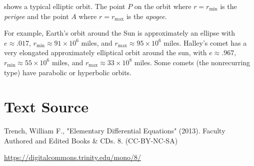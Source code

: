 \documentclass{ximera}
\begin{document}

 shows a typical elliptic orbit.
The point $P$ on the orbit where $r=r_{\min}$ is the  \textit{perigee} and  the point $A$ where $r=r_{\max}$ is the \textit{apogee}.

For example, Earth's orbit around the Sun is approximately an ellipse
with $e\approx.017$, $r_{\min}\approx91\times 10^6$ miles, and
$r_{\max}\approx 95\times 10^6$ miles. Halley's comet has a very
elongated approximately elliptical orbit around the sun, with
$e\approx.967$, $r_{\min}\approx55\times10^6$ miles, and
$r_{\max}\approx33\times10^8$ miles. Some comets (the nonrecurring
type) have parabolic or hyperbolic orbits.

\section*{Text Source}
Trench, William F., "Elementary Differential Equations" (2013). Faculty Authored and Edited Books \& CDs. 8. (CC-BY-NC-SA)

\href{https://digitalcommons.trinity.edu/mono/8/}{https://digitalcommons.trinity.edu/mono/8/}
\end{document}
